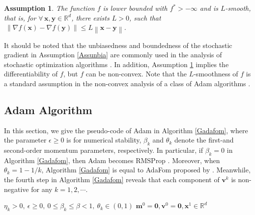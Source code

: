 \documentclass[twoside,11pt]{article}
\newtheorem{assumption}{Assumption}
\begin{document}
\begin{assumption}\label{Assmin}
The function $f$ is lower bounded with $f^*>-\infty$ and is $L$-smooth, that is,  for $\forall\,\mathbf{x},\mathbf{y}\in{\mathbb{R}^d}$, there exists $L>0$, such that $\ \left\| \nabla f(\mathbf{x})-\nabla f(\mathbf{y})\right\|  \le L\left\| \mathbf{x}-\mathbf{y}\right\| $.
\end{assumption}


\par It should be noted that the unbiasedness and boundedness of the stochastic gradient in Assumption \ref{Assunbia} are commonly used in the analysis of stochastic optimization algorithms \citep[e.g.,][]{Nemirovski2008RobustSA,rakhlin2012making,sun2020novel,dong2022stochastic,defazio2022adaptivity}. In addition, Assumption \ref{Assmin} implies the differentiability of $f$, but $f$ can be non-convex. Note that the $L$-smoothness of $f$ is a standard assumption in the non-convex analysis of a class of Adam algorithms \citep[e.g.,][]{chen2019convergence,gadat2022asymptotic,kavis2022high,wang2023convergence}.
	

\subsection{Adam Algorithm}\label{suanfa}
In this section, we give the pseudo-code of Adam in Algorithm \ref{Gadafom}, where the parameter $\epsilon\geq 0$ is for numerical stability, $\beta_{k}$ and $\theta_{k}$ denote the first-and second-order momentum parameters, respectively.
In particular, if $\beta_k=0$ in Algorithm \ref{Gadafom}, then Adam becomes  RMSProp \citep[see][]{tieleman2012lecture}. Moreover, when $\theta_k=1-1/k$, Algorithm \ref{Gadafom} is equal to AdaFom proposed by \citet{chen2019convergence}. Meanwhile, the fourth step in Algorithm \ref{Gadafom} reveals that each component of $\mathbf{v}^k$ is non-negative for any $k=1,2,\cdots$.
\begin{algorithm}[H]
	\caption{Adam}
	\label{Gadafom}
	\begin{algorithmic}[1]
		\Require
		$\eta_k>0,\ 
		\epsilon\ge0,\ 0\le\beta_k\le\beta<1,\ \theta_k\in(0,1)$
		\Ensure
		$\mathbf{m}^0=\mathbf{0},\mathbf{v}^0=\mathbf{0},\mathbf{x}^1\in\mathbb{R}^d$
		\For{$k=1,2,\cdots$}
		\EndFor
	\end{algorithmic}
\end{algorithm}
\end{document}
